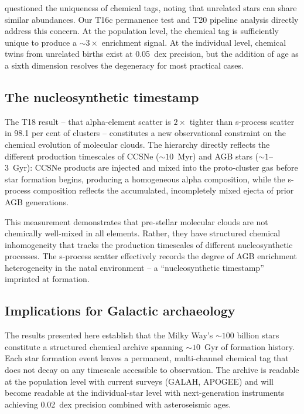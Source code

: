 \documentclass[fleqn,usenatbib]{mnras}
\begin{document}
\citet{Hogg2016} questioned the uniqueness of chemical tags, noting that unrelated stars can share similar abundances.
Our T16c permanence test and T20 pipeline analysis directly address this concern.
At the population level, the chemical tag is sufficiently unique to produce a ${\sim}3\times$ enrichment signal.
At the individual level, chemical twins from unrelated births exist at 0.05~dex precision, but the addition of age as a sixth dimension resolves the degeneracy for most practical cases.

\subsection{The nucleosynthetic timestamp}

The T18 result -- that alpha-element scatter is $2\times$ tighter than s-process scatter in 98.1 per cent of clusters -- constitutes a new observational constraint on the chemical evolution of molecular clouds.
The hierarchy directly reflects the different production timescales of CCSNe (${\sim}10$~Myr) and AGB stars (${\sim}1$--3~Gyr): CCSNe products are injected and mixed into the proto-cluster gas before star formation begins, producing a homogeneous alpha composition, while the s-process composition reflects the accumulated, incompletely mixed ejecta of prior AGB generations.

This measurement demonstrates that pre-stellar molecular clouds are not chemically well-mixed in all elements.
Rather, they have structured chemical inhomogeneity that tracks the production timescales of different nucleosynthetic processes.
The s-process scatter effectively records the degree of AGB enrichment heterogeneity in the natal environment -- a ``nucleosynthetic timestamp'' imprinted at formation.

\subsection{Implications for Galactic archaeology}

The results presented here establish that the Milky Way's ${\sim}100$ billion stars constitute a structured chemical archive spanning ${\sim}10$~Gyr of formation history.
Each star formation event leaves a permanent, multi-channel chemical tag that does not decay on any timescale accessible to observation.
The archive is readable at the population level with current surveys (GALAH, APOGEE) and will become readable at the individual-star level with next-generation instruments achieving 0.02~dex precision combined with asteroseismic ages.
\end{document}
